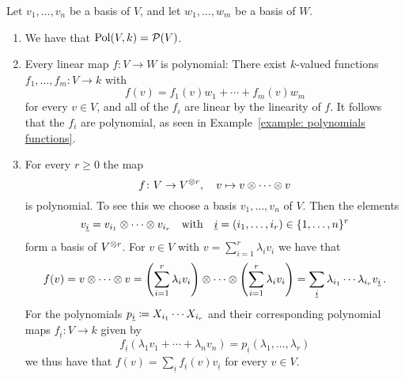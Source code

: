 \begin{example}
  \label{example: polynomial maps}
  Let $v_1, \dotsc, v_n$ be a basis of $V$, and let $w_1, \dotsc, w_m$ be a basis of $W$.
  \leavevmode
  \begin{enumerate}
    \item
      We have that $\operatorname{Pol}(V,k) = \mathcal{P}(V)$.
    \item
      Every linear map $f \colon V \to W$ is polynomial:
      There exist $k$-valued functions $f_1, \dotsc, f_m \colon V \to k$ with
      \[
          f(v)
        = f_1(v) w_1 + \dotsb + f_m(v) w_m
      \]
      for every $v \in V$, and all of the $f_i$ are linear by the linearity of $f$.
      It follows that the $f_i$ are polynomial, as seen in Example~\ref{example: polynomials functions}.
    \item
      For every $r \geq 0$ the map
      \[
                f
        \colon  V
        \to     V^{\mathbin{\otimes} r},
        \quad   v
        \mapsto v \mathbin{\otimes} \dotsb \mathbin{\otimes} v
      \]
      is polynomial.
      To see this we choose a basis $v_1, \dotsc, v_n$ of $V$.
      Then the elements
      \[
          v_{\underline{i}}
        = v_{i_1} \mathbin{\otimes} \dotsb \mathbin{\otimes} v_{i_r}
        \quad\text{with}\quad
            \underline{i}
        =   (i_1, \dotsc, i_r)
        \in \{1, \dotsc, n\}^r
      \]
      form a basis of $V^{\mathbin{\otimes} r}$.
      For $v \in V$ with $v = \sum_{i=1}^r \lambda_i v_i$ we have that
      \[
          f(v)
        = v \mathbin{\otimes} \dotsb \mathbin{\otimes} v
        =         \left( \sum_{i=1}^r \lambda_i v_i \right)
          \mathbin{\otimes} \dotsb
          \mathbin{\otimes} \left( \sum_{i=1}^r \lambda_i v_i \right)
        = \sum_{\underline{i}} \lambda_{i_1} \dotsm \lambda_{i_r} v_{\underline{i}} \,.
      \]
      For the polynomials $p_{\underline{i}} \coloneqq  X_{i_1} \dotsm X_{i_r}$ and their corresponding polynomial maps $f_{\underline{i}} \colon V \to k$ given by
      \[
          f_{\underline{i}}\left( \lambda_1 v_1 + \dotsb + \lambda_n v_n \right) = p_{\underline{i}}(\lambda_1, \dotsc, \lambda_r)
      \]
      we thus have that $f(v) = \sum_{\underline{i}} f_{\underline{i}}(v) v_{\underline{i}}$ for every $v \in V$.
  \end{enumerate}
\end{example}


